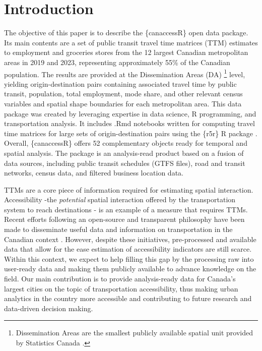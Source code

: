 \documentclass[Royal,times,sageh]{sagej}
\begin{document}
\maketitle

\section{Introduction}\label{introduction}

The objective of this paper is to describe the \{canaccessR\} open data
package. Its main contents are a set of public transit travel time
matrices (TTM) estimates to employment and groceries stores from the 12
largest Canadian metropolitan areas in 2019 and 2023, representing
approximately 55\% of the Canadian population. The results are provided
at the Dissemination Areas (DA) \footnote{Dissemination Areas are the
  smallest publicly available spatial unit provided by Statistics Canada
  \citep{governmentofcanadaDictionaryCensusPopulation2021a}.} level,
yielding origin-destination pairs containing associated travel time by
public transit, population, total employment, mode share, and other
relevant census variables and spatial shape boundaries for each
metropolitan area. This data package was created by leveraging expertise
in data science, R programming, and transportation analysis. It includes
.Rmd notebooks written for computing travel time matrices for large sets
of origin-destination pairs using the \{r5r\} R package
\citep{pereiraR5rRapidRealistic2021}. Overall, \{canaccessR\} offers 52
complementary objects ready for temporal and spatial analysis. The
package is an analysis-read product based on a fusion of data sources,
including public transit schedules (GTFS files), road and transit
networks, census data, and filtered business location data.

TTMs are a core piece of information required for estimating spatial
interaction. Accessibility -the \emph{potential} spatial interaction
offered by the transportation system to reach destinations
\citep{paezMeasuringAccessibilityPositive2012}- is an example of a
measure that requires TTMs. Recent efforts following an open-source and
transparent philosophy have been made to disseminate useful data and
information on transportation in the Canadian context
\citep{soukhovTTS2016RDataSet2023}. However, despite these initiatives,
pre-processed and available data that allow for the ease estimation of
accessibility indicators are still scarce. Within this context, we
expect to help filling this gap by the processing raw into user-ready
data and making them publicly available to advance knowledge on the
field. Our main contribution is to provide analysis-ready data for
Canada's largest cities on the topic of transportation accessibility,
thus making urban analytics in the country more accessible and
contributing to future research and data-driven decision making.
\end{document}
